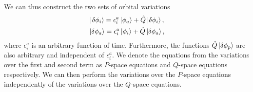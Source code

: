             We can thus construct the two sets of orbital variations
            \begin{gather}
                \ket*{\delta\phi_i}
                = \epsilon^{a}_{i}\ket*{\phi_a}
                + \hat{Q}\ket*{\delta\phi_i},
                \\
                \ket*{\delta\phi_a}
                = \epsilon^{a}_{i}\ket*{\phi_i}
                + \hat{Q}\ket*{\delta\phi_a},
            \end{gather}
            where $\epsilon^{a}_{i}$ is an arbitrary function of time.
            Furthermore, the functions $\hat{Q}\ket*{\delta\phi_p}$ are also
            arbitrary and independent of $\epsilon^{a}_{i}$.
            We denote the equations from the variations over the first and
            second term as $P$-space equations and $Q$-space equations
            respectively.
            We can then perform the variations over the $P$-space equations
            independently of the variations over the $Q$-space equations.

